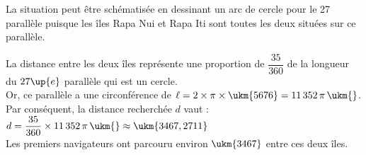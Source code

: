 \begin{corrige}
   La situation peut être schématisée en dessinant un arc de cercle pour le 27 parallèle puisque les îles Rapa Nui et Rapa Iti sont toutes les deux situées sur ce parallèle.
   \begin{center}			
   \end{center}		
   La distance entre les deux îles représente une proportion de $\dfrac{35}{360}$ de la longueur du $27\up{e}$ parallèle qui est un cercle. \\
   Or, ce parallèle a une circonférence de $\ell =2\times\pi\times\ukm{5676} =11\,352\,\pi\,\ukm{}$. \\
   Par conséquent, la distance recherchée $d$ vaut : \\
   $d =\dfrac{35}{360}\times11\,352\,\pi\,\ukm{} \approx \ukm{3467,2711}$ \\					
   {\blue Les premiers navigateurs ont parcouru environ $\ukm{3467}$ entre ces deux îles}.
\end{corrige}

\bigskip


